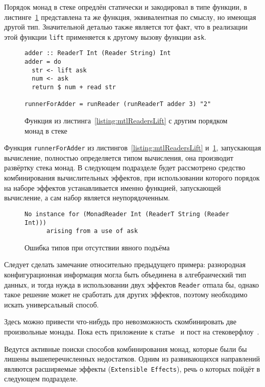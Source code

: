 Порядок монад в стеке опредлён статически и закодировал в типе функции, в листинге~\ref{listing:mtlDifferentReadersLift} представлена та же функция, эквивалентная по смыслу, но имеющая другой тип. Значительной деталью также является тот факт, что в реализации этой функции \lstinline{lift} применяется к другому вызову функции \lstinline{ask}. 

\begin{figure}[t]
\begin{lstlisting}
adder :: ReaderT Int (Reader String) Int
adder = do
  str <- lift ask
  num <- ask
  return $ num + read str

runnerForAdder = runReader (runReaderT adder 3) "2"
\end{lstlisting}
\caption{Функция из листинга~\ref{listing:mtlReadersLift} с другим порядком монад в стеке}
\label{listing:mtlDifferentReadersLift}
\end{figure}

Функция \lstinline{runnerForAdder} из листингов~\ref{listing:mtlReadersLift} и~\ref{listing:mtlDifferentReadersLift}, запускающая вычисление, полностью определяется типом вычисления, она производит развёртку стека монад. В следующем подразделе будет рассмотрено средство комбинирования вычислительных эффектов, при использовании которого порядок на наборе эффектов устанавливается именно функцией, запускающей вычисление, а сам набор является неупорядоченным.     

\begin{figure}[t]
\begin{lstlisting}
No instance for (MonadReader Int (ReaderT String (Reader Int)))
      arising from a use of ask
\end{lstlisting}
\caption{Ошибка типов при отсутствии явного подъёма}
\label{listing:mtlCompileError}
\end{figure}

Следует сделать замечание относительно предыдущего примера: разнородная конфигурационная информация могла быть объединена в алгебраический тип данных, и тогда нужда в использовании двух эффектов \lstinline{Reader} отпала бы, однако такое решение может не сработать для других эффектов, поэтому необходимо искать универсальный способ. 

Здесь можно привести что-нибудь про невозможность скомбинировать две произвольные монады. Пока есть приложение к статье~\autocite{ComposingMonads} и пост на стековерфлоу~\autocite{SOMonadsComposition}.

Ведутся активные поиски способов комбинирования монад, которые были бы лишены вышеперечисленных недостатков. Одним из развивающихся направлений являются расширяемые эффекты (\lstinline{Extensible Effects}), речь о которых пойдёт в следующем подразделе.

